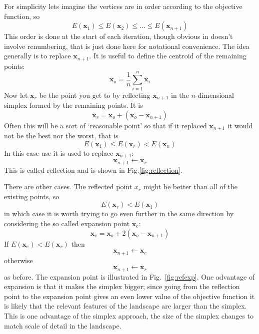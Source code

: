 \documentclass[11pt,a4paper]{scrartcl}
\begin{document}
For simplicity lets imagine the vertices are in order according to the
objective function, so
\begin{equation}
E(\mathbf{x}_1)\le E(\mathbf{x}_2)\le \ldots \le E(\mathbf{x}_{n+1})
\end{equation}
This order is done at the start of each iteration, though obvious in
doesn't involve renumbering, that is just done here for notational
convenience. The idea generally is to replace $\mathbf{x}_{n+1}$. It
is useful to define the centroid of the remaining points:
\begin{equation}
\mathbf{x}_o=\frac{1}{n}\sum_{i=1}^n\mathbf{x}_i
\end{equation}
Now let $\mathbf{x}_r$ be the point you get to by reflecting
$\mathbf{x}_{n+1}$ in the $n$-dimensional simplex formed by the
remaining points. It is
\begin{equation}
\mathbf{x}_r=\mathbf{x}_o+(\mathbf{x}_o-\mathbf{x}_{n+1})
\end{equation}
Often this will be a sort of \lq{}reasonable point\rq{} so that if it replaced
$\mathbf{x}_{n+1}$ it would not be the best nor the worst, that is
\begin{equation}
E(\mathbf{x}_1)\le E(\mathbf{x}_r) < E(\mathbf{x}_n)
\end{equation}
In this case use it is used to replace $\mathbf{x}_{n+1}$:
\begin{equation}
\mathbf{x}_{n+1}\leftarrow \mathbf{x}_r
\end{equation}
This is called reflection and is shown in
Fig.\ref{fig:reflection}.

There are other cases. The reflected point $x_r$ might be better than all
of the existing points, so
\begin{equation}
E(\mathbf{x}_r)<E(\mathbf{x}_1)
\end{equation}
in which case it is worth trying to go even further in the same
direction by considering the so called expansion point $\mathbf{x}_e$:
\begin{equation}
\mathbf{x}_e=\mathbf{x}_o+2(\mathbf{x}_o-\mathbf{x}_{n+1})
\end{equation}
If $E(\mathbf{x}_e)<E(\mathbf{x}_r)$ then
\begin{equation}
\mathbf{x}_{n+1}\leftarrow \mathbf{x}_e
\end{equation}
otherwise
\begin{equation}
\mathbf{x}_{n+1}\leftarrow \mathbf{x}_r
\end{equation}
as before. The expansion point is illustrated in
Fig.~\ref{fig:refexp}. One advantage of expansion is that it makes the
simplex bigger; since going from the reflection point to the expansion
point gives an even lower value of the objective function it is likely
that the relevant features of the landscape are larger than the
simplex. This is one advantage of the simplex approach, the size of
the simplex changes to match scale of detail in the landscape.
\end{document}
